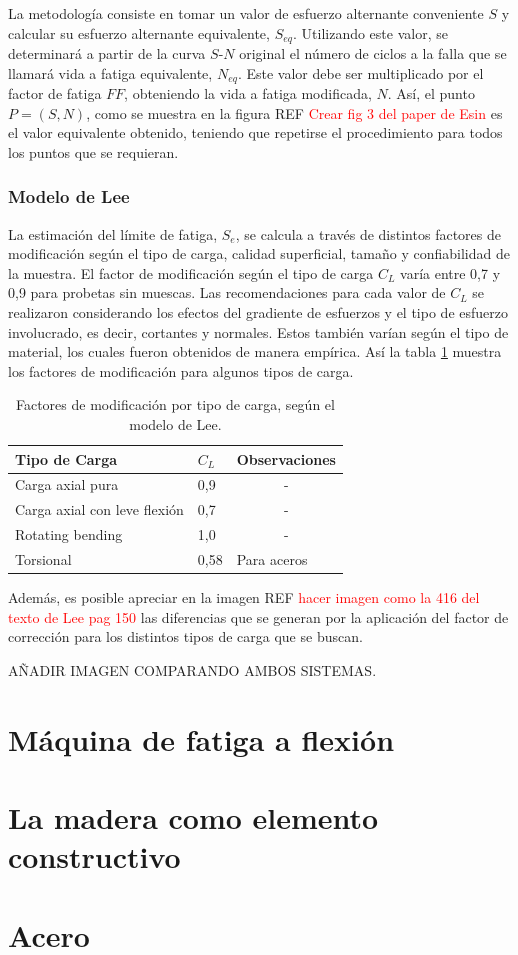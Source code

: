La metodología consiste en tomar un valor de esfuerzo alternante conveniente $S$ y calcular su esfuerzo alternante equivalente, $S_{eq}$. Utilizando este valor, se determinará a partir de la curva $S$-$N$ original el número de ciclos a la falla que se llamará vida a fatiga equivalente, $N_{eq}$. Este valor debe ser multiplicado por el factor de fatiga $FF$, obteniendo la vida a fatiga modificada, $N$. Así, el punto $P=(S,N)$, como se muestra en la figura REF \textcolor{red}{Crear fig 3 del paper de Esin} es el valor equivalente obtenido, teniendo que repetirse el procedimiento para todos los puntos que se requieran.

\subsubsection{Modelo de Lee}
La estimación del límite de fatiga, $S_e$, se calcula a través de distintos factores de modificación según el tipo de carga, calidad superficial, tamaño y confiabilidad de la muestra. El factor de modificación según el tipo de carga $C_L$ varía entre 0,7 y 0,9 para probetas sin muescas. Las recomendaciones para cada valor de $C_L$ se realizaron considerando los efectos del gradiente de esfuerzos y el tipo de esfuerzo involucrado, es decir, cortantes y normales. Estos también varían según el tipo de material, los cuales fueron obtenidos de manera empírica. Así la tabla \ref{tab:lee_factor} muestra los factores de modificación para algunos tipos de carga.

\begin{table}[h]
\centering
\begin{tabular}{@{}llc@{}}
\toprule
Tipo de Carga                & $C_L$ & \multicolumn{1}{l}{Observaciones} \\ \midrule
Carga axial pura             & 0,9   & -                                 \\
Carga axial con leve flexión & 0,7   & -                                 \\
Rotating bending             & 1,0   & -                                 \\
Torsional                    & 0,58  & \multicolumn{1}{l}{Para aceros}   \\ \bottomrule
\end{tabular}
\caption{Factores de modificación por tipo de carga, según el modelo de Lee.}
\label{tab:lee_factor}
\end{table}

Además, es posible apreciar en la imagen REF \textcolor{red}{hacer imagen como la 416 del texto de Lee pag 150} las diferencias que se generan por la aplicación del factor de corrección para los distintos tipos de carga que se buscan. 

AÑADIR IMAGEN COMPARANDO AMBOS SISTEMAS.

\section{Máquina de fatiga a flexión}

\section{La madera como elemento constructivo}

\section{Acero}




